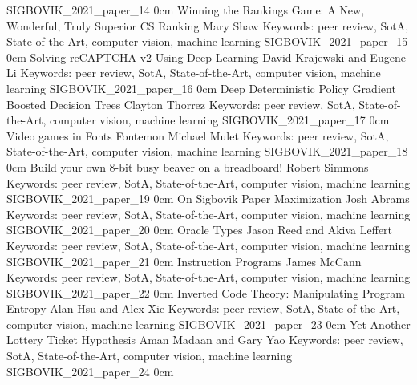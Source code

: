 	{SIGBOVIK_2021_paper_14}
	{0cm}
	{}
\addpaper
	{Winning the Rankings Game: A New, Wonderful, Truly Superior CS Ranking}
	{Mary Shaw}
	{Keywords: peer review, SotA, State-of-the-Art, computer vision, machine learning}
	{SIGBOVIK_2021_paper_15}
	{0cm}
	{}
\addpaper
	{Solving reCAPTCHA v2 Using Deep Learning}
	{David Krajewski and Eugene Li}
	{Keywords: peer review, SotA, State-of-the-Art, computer vision, machine learning}
	{SIGBOVIK_2021_paper_16}
	{0cm}
	{}
\addpaper
	{Deep Deterministic Policy Gradient Boosted Decision Trees}
	{Clayton Thorrez}
	{Keywords: peer review, SotA, State-of-the-Art, computer vision, machine learning}
	{SIGBOVIK_2021_paper_17}
	{0cm}
	{}
\addpaper
	{Video games in Fonts Fontemon}
	{Michael Mulet}
	{Keywords: peer review, SotA, State-of-the-Art, computer vision, machine learning}
	{SIGBOVIK_2021_paper_18}
	{0cm}
	{}
\addpaper
	{Build your own 8-bit busy beaver on a breadboard!}
	{Robert Simmons}
	{Keywords: peer review, SotA, State-of-the-Art, computer vision, machine learning}
	{SIGBOVIK_2021_paper_19}
	{0cm}
	{}
\addpaper
	{On Sigbovik Paper Maximization}
	{Josh Abrams}
	{Keywords: peer review, SotA, State-of-the-Art, computer vision, machine learning}
	{SIGBOVIK_2021_paper_20}
	{0cm}
	{}
\addpaper
	{Oracle Types}
	{Jason Reed and Akiva Leffert}
	{Keywords: peer review, SotA, State-of-the-Art, computer vision, machine learning}
	{SIGBOVIK_2021_paper_21}
	{0cm}
	{}
\addpaper
	{Instruction Programs}
	{James McCann}
	{Keywords: peer review, SotA, State-of-the-Art, computer vision, machine learning}
	{SIGBOVIK_2021_paper_22}
	{0cm}
	{}
\addpaper
	{Inverted Code Theory: Manipulating Program Entropy}
	{Alan Hsu and Alex Xie}
	{Keywords: peer review, SotA, State-of-the-Art, computer vision, machine learning}
	{SIGBOVIK_2021_paper_23}
	{0cm}
	{}
\addpaper
	{Yet Another Lottery Ticket Hypothesis}
	{Aman Madaan and Gary Yao}
	{Keywords: peer review, SotA, State-of-the-Art, computer vision, machine learning}
	{SIGBOVIK_2021_paper_24}
	{0cm}
	{}

